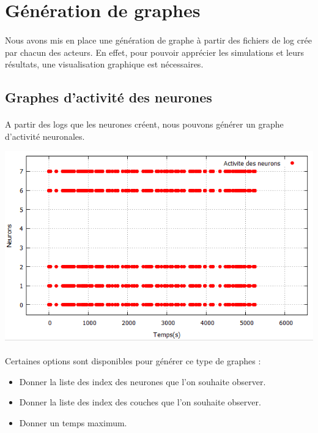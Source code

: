 \documentclass[a4paper,10pt]{article}
\begin{document}
\newpage

\section{Génération de graphes}

\paragraph{}
Nous avons mis en place une génération de graphe à partir des fichiers de log crée par chacun des acteurs. En effet, pour pouvoir apprécier les simulations et leurs résultats, une visualisation graphique est nécessaires.

\subsection{Graphes d’activité des neurones}
\paragraph{}
A partir des logs que les neurones créent, nous pouvons générer un graphe d’activité neuronales. 

\includegraphics[scale=0.95,right]{image/neuronActivity.png}

\paragraph{}
Certaines options sont disponibles pour générer ce type de graphes :
\begin{itemize}
\item{Donner la liste des index des neurones que l’on souhaite observer.}
\item{Donner la liste des index des couches que l’on souhaite observer.}
\item{Donner un temps maximum.}
\end{itemize}
\end{document}
